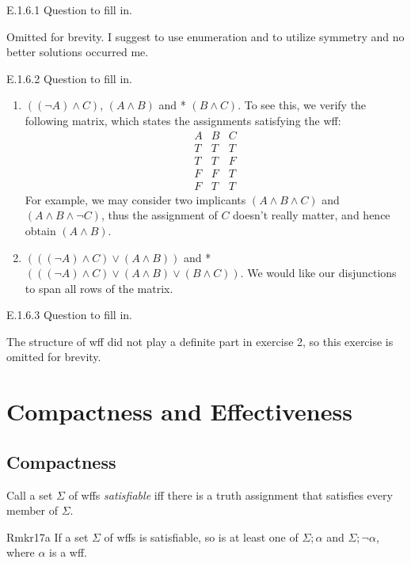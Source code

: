 \begin{exercise}{E.1.6.1}
  Question to fill in.
\end{exercise}

Omitted for brevity. I suggest to use enumeration and to utilize symmetry and no better solutions occurred me.

\begin{exercise}{E.1.6.2}
  Question to fill in.
\end{exercise}

\begin{enumerate}
  \item $((\neg A)\wedge C)$, $(A\wedge B)$ and * $(B\wedge C)$.
        To see this, we verify the following matrix, which states the assignments satisfying the wff:
        \[\begin{matrix}A&B&C\\ T&T&T\\ T&T&F\\ F&F&T\\ F&T&T\end{matrix}\]
        For example, we may consider two implicants $(A\wedge B\wedge C)$ and $(A\wedge B\wedge\neg C)$, thus the assignment of $C$ doesn't really matter, and hence obtain $(A\wedge B)$.
  \item $(((\neg A)\wedge C)\vee(A\wedge B))$ and * $(((\neg A)\wedge C)\vee(A\wedge B)\vee(B\wedge C))$. We would like our disjunctions to span all rows of the matrix.
\end{enumerate}

\begin{exercise}{E.1.6.3}
  Question to fill in.
\end{exercise}

The structure of wff did not play a definite part in exercise 2, so this exercise is omitted for brevity.

\section{Compactness and Effectiveness}

\subsection*{Compactness}

Call a set $\Sigma$ of wffs \textit{satisfiable} iff there is a truth assignment that satisfies every member of $\Sigma$.

\begin{reference}{Rmk}{r17a}
  If a set $\Sigma$ of wffs is satisfiable, so is at least one of $\Sigma;\alpha$ and $\Sigma;\neg \alpha$, where $\alpha$ is a wff.
\end{reference}

